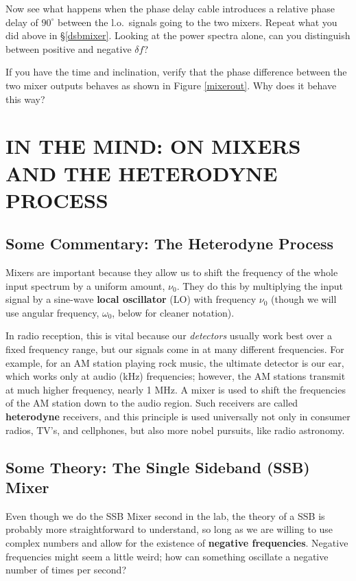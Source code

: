 \documentclass[12pt,preprint]{aastex}
\begin{document}
Now see what happens when the phase delay cable introduces a relative
phase delay of $90^\circ$ between the l.o.\ signals going to the two
mixers.  Repeat what you did above in \S \ref{dsbmixer}. Looking at the
power spectra alone, can you distinguish between positive and negative
$\delta f$?

If you have the time and inclination, verify that the phase difference
between the two mixer outputs behaves as shown in Figure \ref{mixerout}.
Why does it behave this way?  

\section {IN THE MIND: ON MIXERS AND THE HETERODYNE
  PROCESS} \label{hetereo}

%
\subsection{Some Commentary: The Heterodyne Process}
%
Mixers are important because they allow us to shift the frequency of the
whole input spectrum by a uniform amount, $\nu_0$.  They do this by multiplying
the input signal by a sine-wave {\bf local oscillator} (LO) with frequency
$\nu_0$ (though we will use
angular frequency, $\omega_0$, below for cleaner notation).

In radio
reception, this is vital because our {\it
  detectors} usually work best over a fixed frequency range, but our signals
come in at many different frequencies.  For example, for an AM station
playing rock music, the ultimate detector is our ear, which works only
at audio (kHz) frequencies; however, the AM stations transmit at much higher
frequency, nearly 1 MHz.  A mixer is used to shift the frequencies of
the AM station down to the audio region.  Such receivers are called {\bf
  heterodyne} receivers, and this principle is used universally not only
in consumer radios, TV's, and cellphones, but also more nobel pursuits, like
radio astronomy.
%
\subsection{Some Theory: The Single Sideband (SSB) Mixer}

Even though we do the SSB Mixer second in the lab, the theory of a SSB
is probably more straightforward to understand, so long as we are willing
to use complex numbers and allow for the existence of {\bf negative frequencies}.
Negative frequencies might seem a little weird; how can something oscillate
a negative number of times per second?
\end{document}

